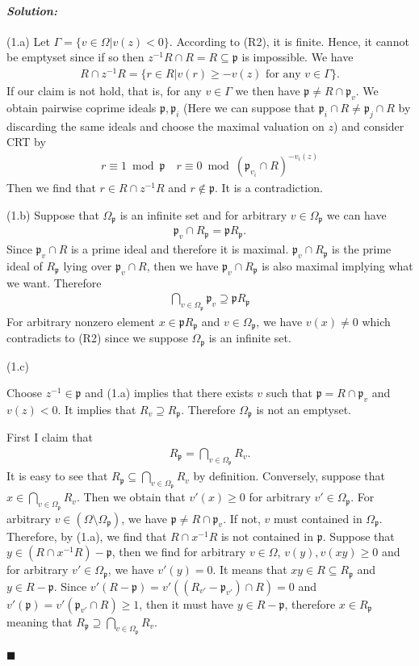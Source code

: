 \documentclass[12pt, a4paper]{article}
\newcommand{\p}{\mathfrak{p}}
\newenvironment{solution}
  {\paragraph{\textit{Solution:}}\par\medskip}
  {\hfill$\blacksquare$\vspace{0.1cm}}
\begin{document}
\begin{solution}
(1.a) Let $\Gamma =\{v\in \Omega|v(z)<0\}$. According to (R2), it is finite. Hence, it cannot be emptyset since if so then $z^{-1}R\cap R = R \subseteq \p$ is impossible.
We have 
\begin{align*}
    R\cap z^{-1}R = \{r\in R|v(r)\ge -v(z)\text{ for any }v\in \Gamma\}.
\end{align*}
If our claim is not hold, that is, for any $v\in \Gamma$ we then have $\p\neq R\cap \p_v$.
We obtain pairwise coprime ideals $\p,\p_i$ (Here we can suppose that $\p_i\cap R\neq \p_j\cap R$ by discarding the same ideals and choose the maximal valuation on $z$)
and consider CRT by 
\begin{align*}
    r \equiv 1 \bmod \p \quad r\equiv  0 \bmod (\p_{v_i}\cap R)^{-v_i(z)}
\end{align*}
Then we find that $r\in R\cap z^{-1}R$ and $r\notin \p$. It is a contradiction.

(1.b)
Suppose that $\Omega_{\p}$ is an infinite set and for arbitrary $v\in\Omega_\p$ we can have
\begin{align*}
    \p_v\cap R_\p = \p R_\p.
\end{align*}
Since $\p_v\cap R $ is a prime ideal and therefore it is maximal. $\p_v\cap R_\p$ is the prime ideal of $R_\p$ lying over $\p_v\cap R$, then we have $\p_v\cap R_\p$ is also maximal implying what we want.
Therefore 
\begin{align*}
    \bigcap_{v\in\Omega_\p}\p_v \supseteq \p R_{\p}
\end{align*}
For arbitrary nonzero element $x\in\p R_\p$ and $v\in\Omega_\p$, we have $v(x)\neq 0$ which contradicts to (R2) since we suppose $\Omega_\p$ is an infinite set.


(1.c)

Choose $z^{-1}\in\p$ and (1.a) implies that there exists $v$ such that $\p=R\cap \p_v$ and $v(z)<0$. 
It implies that $R_v\supseteq R_\p$. Therefore $\Omega_\p$ is not an emptyset.

First I claim that 
\begin{align*}
    R_\p = \bigcap_{v\in\Omega_\p} R_v.
\end{align*}
It is easy to see that $R_\p \subseteq \bigcap_{v\in\Omega_\p} R_v$ by definition. Conversely, suppose that $x\in \bigcap_{v\in\Omega_\p} R_v$. Then we obtain that $v'(x)\ge 0$ for arbitrary $v'\in\Omega_\p$.
For arbitrary $v\in (\Omega\setminus \Omega_\p)$, we have $\p\neq R\cap \p_v$. If not, $v$ must contained in $\Omega_\p$. Therefore, by (1.a), we find that $R\cap x^{-1}R$ is not contained in $\p$.
Suppose that $y\in (R\cap x^{-1}R)-\p$, then we find for arbitrary $v\in\Omega$, $v(y),v(xy)\ge 0$ and for arbitrary $v'\in\Omega_\p$, we have $v'(y)=0$. It means that $xy\in R\subseteq R_\p$ and $y\in R-\p$.
Since $v'(R-\p)= v'((R_{v'}-\p_{v'})\cap R)=0$ and $v'(\p)=v'(\p_{v'}\cap R)\ge 1$, then it must have $y\in R-\p$, therefore $x\in R_\p$ meaning that $R_\p \supseteq \bigcap_{v\in\Omega_\p} R_v$.


\end{solution}
\end{document}
